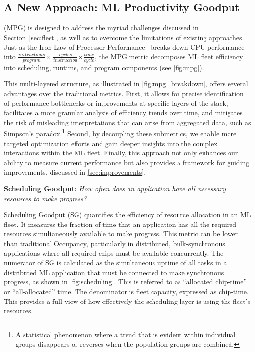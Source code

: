 \subsection{A New Approach: ML Productivity Goodput}

\mpg (MPG) is designed to address the myriad challenges discussed in Section~\ref{sec:fleet}, as well as to overcome the limitations of existing approaches. Just as the Iron Law of Processor Performance~\cite{emer1984ironlaw} breaks down CPU performance into $\frac{instructions}{program}$$\times$ $\frac{cycles}{instruction}$$\times$$\frac{time}{cycle}$, the MPG metric decomposes ML fleet efficiency into scheduling, runtime, and program components (see \autoref{fig:mpg}).



This multi-layered structure, as illustrated in \autoref{fig:mpg_breakdown}, offers several advantages over the traditional metrics. First, it allows for precise identification of performance bottlenecks or improvements at specific layers of the stack, facilitates a more granular analysis of efficiency trends over time, and mitigates the risk of misleading interpretations that can arise from aggregated data, such as Simpson's paradox.\footnote{A statistical phenomenon where a trend that is evident within individual groups disappears or reverses when the population groups are combined.} Second, by decoupling these submetrics, we enable more targeted optimization efforts and gain deeper insights into the complex interactions within the ML fleet. Finally, this approach not only enhances our ability to measure current performance but also provides a framework for guiding improvements, discussed in \autoref{sec:improvements}.  

\textbf{Scheduling Goodput:}
\emph{How often does an application have all necessary resources to make progress?} 

Scheduling Goodput (SG) quantifies the efficiency of resource allocation in an ML fleet. It measures the fraction of time that an application has all the required resources simultaneously available to make progress. This metric can be lower than traditional Occupancy, particularly in distributed, bulk-synchronous applications where all required chips must be available concurrently. The numerator of SG is calculated as the simultaneous uptime of all tasks in a distributed ML application that must be connected to make synchronous progress, as shown in \autoref{fig:scheduling}. This is referred to as ``allocated chip-time'' or ``all-allocated'' time. The denominator is fleet capacity, expressed as chip-time. This provides a full view of how effectively the scheduling layer is using the fleet's resources. 

